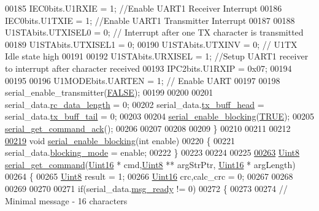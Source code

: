 \begin{DoxyCode}
00185     IEC0bits.U1RXIE   = 1;      \textcolor{comment}{//Enable UART1 Receiver Interrupt}
00186     IEC0bits.U1TXIE   = 1;      \textcolor{comment}{//Enable UART1 Transmitter Interrupt}
00187 
00188     U1STAbits.UTXISEL0 = 0;     \textcolor{comment}{// Interrupt after one TX character is transmitted}
00189     U1STAbits.UTXISEL1 = 0;
00190     U1STAbits.UTXINV   = 0;     \textcolor{comment}{// U1TX Idle state high}
00191 
00192     U1STAbits.URXISEL  = 1;     \textcolor{comment}{//Setup UART1  receiver to interrupt after character received}
00193     IPC2bits.U1RXIP    = 0x07;
00194     
00195 
00196     U1MODEbits.UARTEN  = 1;     \textcolor{comment}{// Enable UART}
00197 
00198     serial\_enable\_transmitter(\hyperlink{a00040_aa93f0eb578d23995850d61f7d61c55c1}{FALSE});
00199     
00200 
00201     serial\_data.\hyperlink{a00030_ab136d4fef2c523afd55b6ca74c46d7cc}{rc\_data\_length} = 0;
00202     serial\_data.\hyperlink{a00030_a3e2eda0a020422511de91b2bc7386083}{tx\_buff\_head} = serial\_data.\hyperlink{a00030_a6287e1447d7902b8bbc2f6359065dcbd}{tx\_buff\_tail} = 0;
00203 
00204     \hyperlink{a00030_af15ca641f181de14f789d97b00c367ef}{serial\_enable\_blocking}(\hyperlink{a00040_aa8cecfc5c5c054d2875c03e77b7be15d}{TRUE});
00205     \hyperlink{a00030_a7fc7421ed15d6e4516e9878e7455d715}{serial\_get\_command\_ack}();
00206 
00207 
00208 
00209 \}
00210 
00211 
00212 
\hypertarget{a00030_source_l00219}{}\hyperlink{a00030_af15ca641f181de14f789d97b00c367ef}{00219} \textcolor{keywordtype}{void}    \hyperlink{a00030_af15ca641f181de14f789d97b00c367ef}{serial\_enable\_blocking}(\textcolor{keywordtype}{int} enable)
00220 \{
00221         serial\_data.\hyperlink{a00030_a758ac775caab1899af08024d4635f7e3}{blocking\_mode} = enable;
00222 \}
00223 
00224 
00225 
\hypertarget{a00030_source_l00263}{}\hyperlink{a00030_a366b2707f4c7d76f0efc1b5cdde8e37e}{00263} \hyperlink{a00072_af84840501dec18061d18a68c162a8fa2}{Uint8}   \hyperlink{a00030_a366b2707f4c7d76f0efc1b5cdde8e37e}{serial\_get\_command}(\hyperlink{a00072_a59a9f6be4562c327cbfb4f7e8e18f08b}{Uint16} * cmd,\hyperlink{a00072_af84840501dec18061d18a68c162a8fa2}{Uint8} ** argStrPtr,
      \hyperlink{a00072_a59a9f6be4562c327cbfb4f7e8e18f08b}{Uint16} * argLength)
00264 \{
00265     \hyperlink{a00072_af84840501dec18061d18a68c162a8fa2}{Uint8} result = 1;
00266     \hyperlink{a00072_a59a9f6be4562c327cbfb4f7e8e18f08b}{Uint16} crc,calc\_crc = 0;
00267    
00268 
00269     
00270 
00271     \textcolor{keywordflow}{if}(serial\_data.\hyperlink{a00030_ac0789a6c9ab7ccd13d6f04ae31496854}{msg\_ready} != 0)
00272     \{
00273 
00274         \textcolor{comment}{// Minimal message - 16 characters}

\end{DoxyCode}
